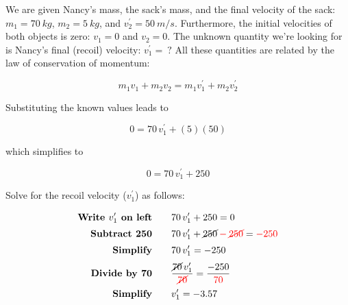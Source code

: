 \documentclass[]{exam}
\begin{document}
\begin{questions}
\begin{center}
%
\hspace{2cm}
\end{center}



\begin{solution}
We are given Nancy's mass, the sack's mass, and the final velocity of the sack: $m_1 = \SI{70}{kg}$, $m_2 = \SI{5}{kg}$, and $v_2^{\prime} = \SI{50}{m/s}$. Furthermore, the initial velocities of both objects is zero: $v_1 = 0$ and $v_2 = 0$. The unknown quantity we're looking for is Nancy's final (recoil) velocity: $v_1^{\prime} =\ ?$ All these quantities are related by the law of conservation of momentum:

\begin{equation*}
    m_1 v_1 + m_2 v_2 = m_1 v_1^{\prime} + m_2 v_2^{\prime}
\end{equation*}

Substituting the known values leads to 

\begin{equation*}
    0 = 70\,v_1^{\prime} + (5)(50)
\end{equation*}

 which simplifies to 

 \begin{equation*}
     0 = 70\,v_1^{\prime} + 250
 \end{equation*}

 Solve for the recoil velocity ($v_1^{\prime}$) as follows:

 \begin{align*}
     \textbf{Write $v_1^{\prime}$ on left} \qquad & 70\,v_1^{\prime} + 250 = 0\\[0.5ex]
     \textbf{Subtract 250} \qquad & 70\,v_1^{\prime} + \cancel{250} \mathbin{\color{red} - } \textcolor{red}{\cancel{250}} = \mathbin{\color{red} - } \textcolor{red}{250}\\[0.5ex]
     \textbf{Simplify} \qquad &  70\,v_1^{\prime} = -250\\[0.5ex]
     \textbf{Divide by 70} \qquad & \frac{\cancel{70}\,v_1^{\prime}}{\textcolor{red}{\cancel{70}}} = \frac{-250}{\textcolor{red}{70}}\\[0.5ex]
     \textbf{Simplify} \qquad & v_1^{\prime} = -3.57\\
 \end{align*}


\end{solution}
\end{questions}
\end{document}
